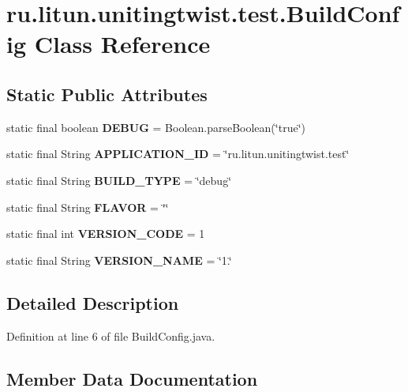 \section{ru.\+litun.\+unitingtwist.\+test.\+Build\+Config Class Reference}
\label{classru_1_1litun_1_1unitingtwist_1_1test_1_1_build_config}
\subsection*{Static Public Attributes}
\begin{DoxyCompactItemize}
\item 
static final boolean \textbf{ D\+E\+B\+UG} = Boolean.\+parse\+Boolean(\char`\"{}true\char`\"{})
\item 
static final String \textbf{ A\+P\+P\+L\+I\+C\+A\+T\+I\+O\+N\+\_\+\+ID} = \char`\"{}ru.\+litun.\+unitingtwist.\+test\char`\"{}
\item 
static final String \textbf{ B\+U\+I\+L\+D\+\_\+\+T\+Y\+PE} = \char`\"{}debug\char`\"{}
\item 
static final String \textbf{ F\+L\+A\+V\+OR} = \char`\"{}\char`\"{}
\item 
static final int \textbf{ V\+E\+R\+S\+I\+O\+N\+\_\+\+C\+O\+DE} = 1
\item 
static final String \textbf{ V\+E\+R\+S\+I\+O\+N\+\_\+\+N\+A\+ME} = \char`\"{}1.\char`\"{}
\end{DoxyCompactItemize}


\subsection{Detailed Description}


Definition at line 6 of file Build\+Config.\+java.



\subsection{Member Data Documentation}
\mbox{\label{classru_1_1litun_1_1unitingtwist_1_1test_1_1_build_config_a94119f406ca64d6354e89f129b80f40a}} 
